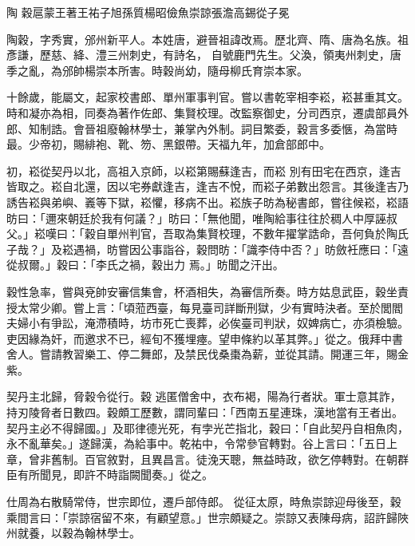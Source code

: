 
\begin{pinyinscope}

 陶
 穀扈蒙王著王祐子旭孫質楊昭儉魚崇諒張澹高錫從子冕



 陶穀，字秀實，邠州新平人。本姓唐，避晉祖諱改焉。歷北齊、隋、唐為名族。祖彥謙，歷慈、絳、澧三州刺史，有詩名，
 自號鹿門先生。父渙，領夷州刺史，唐季之亂，為邠帥楊崇本所害。時穀尚幼，隨母柳氏育崇本家。



 十餘歲，能屬文，起家校書郎、單州軍事判官。嘗以書乾宰相李崧，崧甚重其文。時和凝亦為相，同奏為著作佐郎、集賢校理。改監察御史，分司西京，遷虞部員外郎、知制誥。會晉祖廢翰林學士，兼掌內外制。詞目繁委，穀言多委愜，為當時最。少帝初，賜緋袍、靴、笏、黑銀帶。天福九年，加倉部郎中。



 初，崧從契丹以北，高祖入京師，以崧第賜蘇逢吉，而崧
 別有田宅在西京，逢吉皆取之。崧自北還，因以宅券獻逢吉，逢吉不悅，而崧子弟數出怨言。其後逢吉乃誘告崧與弟嶼、㠖等下獄，崧懼，移病不出。崧族子昉為秘書郎，嘗往候崧，崧語昉曰：「邇來朝廷於我有何議？」昉曰：「無他聞，唯陶給事往往於稠人中厚誣叔父。」崧嘆曰：「穀自單州判官，吾取為集賢校理，不數年擢掌誥命，吾何負於陶氏子哉？」及崧遇禍，昉嘗因公事詣谷，穀問昉：「識李侍中否？」昉斂衽應曰：「遠從叔爾。」穀曰：「李氏之禍，穀出力
 焉。」昉聞之汗出。



 穀性急率，嘗與兗帥安審信集會，杯酒相失，為審信所奏。時方姑息武臣，穀坐責授太常少卿。嘗上言：「頃蒞西臺，每見臺司詳斷刑獄，少有實時決者。至於閭閻夫婦小有爭訟，淹滯積時，坊市死亡喪葬，必俟臺司判狀，奴婢病亡，亦須檢驗。吏因緣為奸，而邀求不已，經旬不獲埋瘞。望申條約以革其弊。」從之。俄拜中書舍人。嘗請教習樂工、停二舞郎，及禁民伐桑棗為薪，並從其請。開運三年，賜金紫。



 契丹主北歸，脅穀令從行。穀
 逃匿僧舍中，衣布褐，陽為行者狀。軍士意其詐，持刃陵脅者日數四。穀頗工歷數，謂同輩曰：「西南五星連珠，漢地當有王者出。契丹主必不得歸國。」及耶律德光死，有孛光芒指北，穀曰：「自此契丹自相魚肉，永不亂華矣。」遂歸漢，為給事中。乾祐中，令常參官轉對。谷上言曰：「五日上章，曾非舊制。百官敘對，且異昌言。徒浼天聰，無益時政，欲乞停轉對。在朝群臣有所聞見，即許不時詣闕聞奏。」從之。



 仕周為右散騎常侍，世宗即位，遷戶部侍郎。
 從征太原，時魚崇諒迎母後至，穀乘間言曰：「崇諒宿留不來，有顧望意。」世宗頗疑之。崇諒又表陳母病，詔許歸陜州就養，以穀為翰林學士。




\end{pinyinscope}
